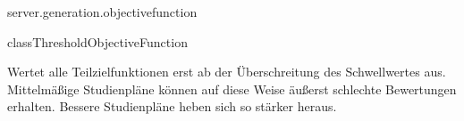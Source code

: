 \begin{texdocpackage}{server.generation.objectivefunction}
\begin{texdocclass}{class}{ThresholdObjectiveFunction}
\label{texdoclet:edu.kit.informatik.studyplan.server.generation.objectivefunction.ThresholdObjectiveFunction}
\begin{texdocclassintro}
Wertet alle Teilzielfunktionen erst ab der Überschreitung des Schwellwertes aus.
 Mittelmäßige Studienpläne können auf diese Weise äußerst schlechte Bewertungen erhalten.
 Bessere Studienpläne heben sich so stärker heraus.\end{texdocclassintro}
\begin{texdocclassconstructors}
\end{texdocclassconstructors}
\begin{texdocclassmethods}
\end{texdocclassmethods}
\end{texdocclass}


\end{texdocpackage}



